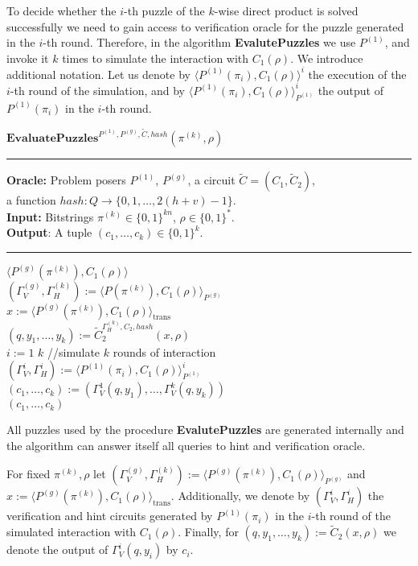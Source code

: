 To decide whether the $i$-th puzzle of the $k$-wise direct product is solved successfully we need to gain access to verification oracle
for the puzzle generated in the $i$-th round.
Therefore, in the algorithm \textbf{EvalutePuzzles} we use $P^{(1)}$, and invoke it $k$ times to simulate the interaction with $C_1(\rho)$.
We introduce additional notation. Let us denote by $\langle P^{(1)}(\pi_i), C_1(\rho)\rangle^i$ the execution of
the $i$-th round of the simulation, and by $\langle P^{(1)}(\pi_i), C_1(\rho)\rangle^i_{P^{(1)}}$ the output of $P^{(1)}(\pi_i)$ in the $i$-th round.
%
\begin{codeblock}
  $\textbf{EvaluatePuzzles}^{P^{(1)}, P^{(g)}, \widetilde{C}, hash}(\pi^{(k)}, \rho)$
  \medskip \hrule \medskip
  \textbf{Oracle:}  Problem posers $P^{(1)}$, $P^{(g)}$, a circuit $\widetilde{C} = (C_1, \widetilde{C}_2)$,\\
  \IndII a function $hash : Q \rightarrow \{0,1,\dots, 2(h+v)-1\}$.\\
  \textbf{Input:} Bitstrings $\pi^{(k)} \in \{0,1\}^{kn}$, $\rho \in \{0,1\}^{*}$.\\
  \textbf{Output}: A tuple $(c_1, \dots, c_k) \in \{0,1\}^{k}$.
  \medskip\hrule\medskip
  \Run $\langle P^{(g)}(\pi^{(k)}), C_1(\rho) \rangle$ \\
  \IndI $(\Gamma_V^{(g)}, \Gamma_H^{(k)}) := \langle P(\pi^{(k)}), C_1(\rho) \rangle_{P^{(g)}}$ \\
  \IndI $x := \langle P^{(g)}(\pi^{(k)}), C_1(\rho) \rangle_{\text{trans}}$ \\
  $(q, y_1, \dots, y_k) := \widetilde{C}_2^{\Gamma_H^{(k)}, C_2, hash} (x, \rho)$ \\
  \For $i:=1$ \To $k$ \Do \IndII //simulate $k$ rounds of interaction \\
  \IndI $(\Gamma_V^{i}, \Gamma_H^{i}) := \langle P^{(1)}(\pi_i), C_1(\rho) \rangle_{P^{(1)}}^i$\\
  $(c_1, \dots, c_k) := (\Gamma_V^{1}(q, y_1), \dots, \Gamma_V^{k}(q, y_k))$\\
  \Return $(c_1, \dots, c_k)$
\end{codeblock}
%
All puzzles used by the procedure \textbf{EvalutePuzzles} are generated internally and the algorithm can answer itself
all queries to hint and verification oracle.

For fixed $\pi^{(k)}, \rho$ let $(\Gamma_V^{(g)}, \Gamma_H^{(k)}) := \langle P^{(g)}(\pi^{(k)}), C_1(\rho) \rangle_{P^{(g)}}$
and $x := \langle P^{(g)}(\pi^{(k)}), C_1(\rho) \rangle_{\text{trans}}$.
Additionally, we denote by $(\Gamma_V^{i}, \Gamma_H^{i})$ the verification and hint circuits generated by $P^{(1)}(\pi_i)$ in the $i$-th
round of the simulated interaction with $C_1(\rho)$.
Finally, for $(q,y_1, \dots, y_k) := \widetilde{C}_2(x, \rho)$ we denote the output of $\Gamma_V^i(q,y_i)$ by $c_i$.

